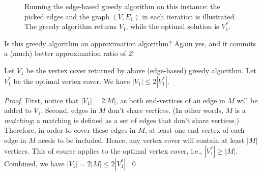 \begin{algorithmblock}[0.8\textwidth]
	\xxx
	\xxx
	\xxx
	\xxx
	\xxx
	\xxx
	\xxx
	\xxx
\end{algorithmblock}


\begin{figure}[h]
\centering{}
\caption{Running the edge-based greedy algorithm on this instance:
the picked edges and the graph $(V, E_1)$ in each iteration is illustrated. 
The greedy algorithm returns $V_1$, while the optimal solution is $V_1^*$.}
\label{fig:greedy2}
\end{figure}

Is this greedy algorithm an approximation algorithm? Again yes, and it commits
a (much) better approximation ratio of 2!
\begin{fact}
Let $V_1$ be the vertex cover returned by above (edge-based) greedy algorithm.
Let $V_1^*$ be the optimal vertex cover.
We have $|V_1| \le 2 |V_1^*|$.
\end{fact}
\emph{Proof.} First, notice that $|V_1| = 2|M|$, as both end-vertices
of an edge in $M$ will be added to $V_1$. Second, edges in $M$ don't
share vertices. (In other words, $M$ is a \emph{matching}; a matching
is defined as a set of edges that don't share vertices.)
Therefore, in order to cover these edges in $M$, at least
one end-vertex of each edge in $M$ needs to be included.
Hence, any vertex cover will contain at least $|M|$ vertices.
This of course applies to the optimal vertex cover, i.e., $|V_1^*| \ge |M|$.
Combined, we have $|V_1| = 2|M| \le 2|V_1^*|$.  \qed

